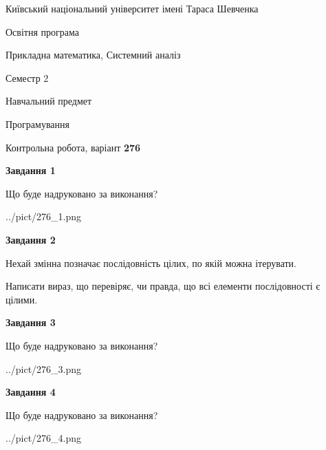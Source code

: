 \documentclass[12pt, ukrainian]{article}
\begin{document}
{{\begin {small}\par
{ \center  Київський національний університет імені Тараса Шевченка \par}
{\parbox {5 cm}{Освітня програма \hfill}{\parbox {8 cm}{Прикладна математика, Системний аналіз \hfill}}\parbox {5 cm}{\hfill Семестр 2}}\par
{\parbox {5 cm} {Навчальний предмет \hfill}\parbox {7 cm}{Програмування \hfill}\parbox {6cm}{\hfill}\par}\vspace{-7pt} \end{small}}{\center Контрольна робота, варіант  \No \textbf
{ 276 }\par}}
{
\begin {large}
{\begin {center}\textbf{Завдання 1}\end {center}}\par
Що буде надруковано за виконання?\par\par
\begin{center}
	{../pict/276_1.png}
\end{center}
\newpage

{\begin {center}\textbf{Завдання 2}\end {center}}\par
Нехай змінна  позначає послідовність цілих, по якій можна ітерувати.

Написати вираз, що перевіряє, чи правда, що всі елементи послідовності є цілими.\par
\newpage

{\begin {center}\textbf{Завдання 3}\end {center}}\par
Що буде надруковано за виконання?
\begin{center}
	{../pict/276_3.png}
\end{center}
\newpage

{\begin {center}\textbf{Завдання 4}\end {center}}\par
Що буде надруковано за виконання?\par
\begin{center}
	{../pict/276_4.png}
\end{center}
\newpage


\end{large}}
\end{document}
